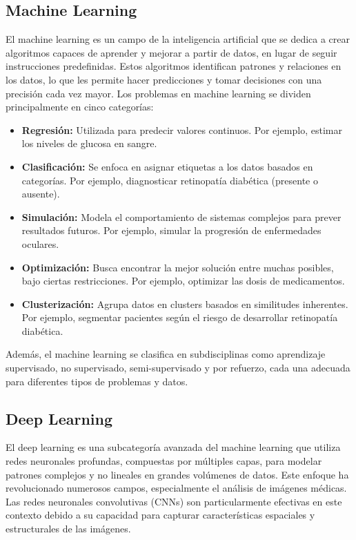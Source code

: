 \subsection{Machine Learning}

El machine learning es un campo de la inteligencia artificial que se dedica a crear algoritmos capaces de aprender y mejorar a partir de datos, en lugar de seguir instrucciones predefinidas. Estos algoritmos identifican patrones y relaciones en los datos, lo que les permite hacer predicciones y tomar decisiones con una precisión cada vez mayor. Los problemas en machine learning se dividen principalmente en cinco categorías:

\begin{itemize}
 \item \textbf{Regresión:} Utilizada para predecir valores continuos. Por ejemplo, estimar los niveles de glucosa en sangre.
 \item \textbf{Clasificación:} Se enfoca en asignar etiquetas a los datos basados en categorías. Por ejemplo, diagnosticar retinopatía diabética (presente o ausente).
 \item \textbf{Simulación:} Modela el comportamiento de sistemas complejos para prever resultados futuros. Por ejemplo, simular la progresión de enfermedades oculares.
 \item \textbf{Optimización:} Busca encontrar la mejor solución entre muchas posibles, bajo ciertas restricciones. Por ejemplo, optimizar las dosis de medicamentos.
 \item \textbf{Clusterización:} Agrupa datos en clusters basados en similitudes inherentes. Por ejemplo, segmentar pacientes según el riesgo de desarrollar retinopatía diabética.
\end{itemize}

Además, el machine learning se clasifica en subdisciplinas como aprendizaje supervisado, no supervisado, semi-supervisado y por refuerzo, cada una adecuada para diferentes tipos de problemas y datos.

\subsection{Deep Learning}

El deep learning es una subcategoría avanzada del machine learning que utiliza redes neuronales profundas, compuestas por múltiples capas, para modelar patrones complejos y no lineales en grandes volúmenes de datos. Este enfoque ha revolucionado numerosos campos, especialmente el análisis de imágenes médicas. Las redes neuronales convolutivas (CNNs) son particularmente efectivas en este contexto debido a su capacidad para capturar características espaciales y estructurales de las imágenes.

